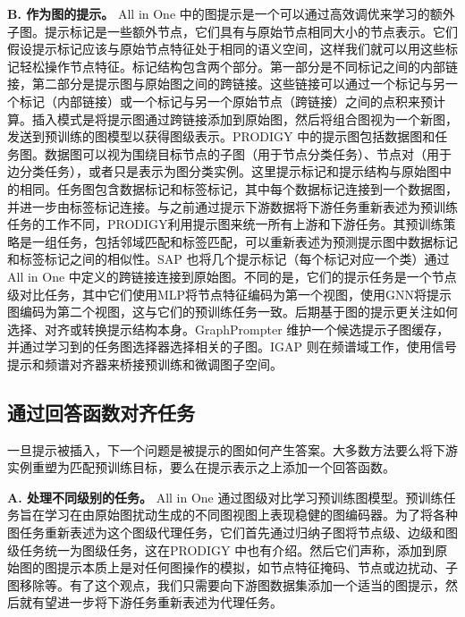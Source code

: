 \textbf{B. 作为图的提示。}
All in One \cite{sun2023all} 中的图提示是一个可以通过高效调优来学习的额外子图。提示标记是一些额外节点，它们具有与原始节点相同大小的节点表示。它们假设提示标记应该与原始节点特征处于相同的语义空间，这样我们就可以用这些标记轻松操作节点特征。标记结构包含两个部分。第一部分是不同标记之间的内部链接，第二部分是提示图与原始图之间的跨链接。这些链接可以通过一个标记与另一个标记（内部链接）或一个标记与另一个原始节点（跨链接）之间的点积来预计算。插入模式是将提示图通过跨链接添加到原始图，然后将组合图视为一个新图，发送到预训练的图模型以获得图级表示。PRODIGY \cite{huang2023prodigy} 中的提示图包括数据图和任务图。数据图可以视为围绕目标节点的子图（用于节点分类任务）、节点对（用于边分类任务），或者只是表示为图分类实例。这里提示标记和提示结构与原始图中的相同。任务图包含数据标记和标签标记，其中每个数据标记连接到一个数据图，并进一步由标签标记连接。与之前通过提示下游数据将下游任务重新表述为预训练任务的工作不同，PRODIGY利用提示图来统一所有上游和下游任务。其预训练策略是一组任务，包括邻域匹配和标签匹配，可以重新表述为预测提示图中数据标记和标签标记之间的相似性。SAP \cite{ge2023enhancing} 也将几个提示标记（每个标记对应一个类）通过 All in One 中定义的跨链接连接到原始图。不同的是，它们的提示任务是一个节点级对比任务，其中它们使用MLP将节点特征编码为第一个视图，使用GNN将提示图编码为第二个视图，这与它们的预训练任务一致。后期基于图的提示更关注如何选择、对齐或转换提示结构本身。GraphPrompter \cite{lv2025graphprompter} 维护一个候选提示子图缓存，并通过学习到的任务图选择器选择相关的子图。IGAP \cite{yan2024igap} 则在频谱域工作，使用信号提示和频谱对齐器来桥接预训练和微调图子空间。


\subsection{通过回答函数对齐任务}\label{sec:align}

\textit{ }

一旦提示被插入，下一个问题是被提示的图如何产生答案。大多数方法要么将下游实例重塑为匹配预训练目标，要么在提示表示之上添加一个回答函数。

\textbf{A. 处理不同级别的任务。}
All in One \cite{sun2023all} 通过图级对比学习预训练图模型。预训练任务旨在学习在由原始图扰动生成的不同图视图上表现稳健的图编码器。为了将各种图任务重新表述为这个图级代理任务，它们首先通过归纳子图将节点级、边级和图级任务统一为图级任务，这在PRODIGY \cite{huang2023prodigy,liu2023graphprompt,gong2023prompt} 中也有介绍。然后它们声称，添加到原始图的图提示本质上是对任何图操作的模拟，如节点特征掩码、节点或边扰动、子图移除等。有了这个观点，我们只需要向下游图数据集添加一个适当的图提示，然后就有望进一步将下游任务重新表述为代理任务。


